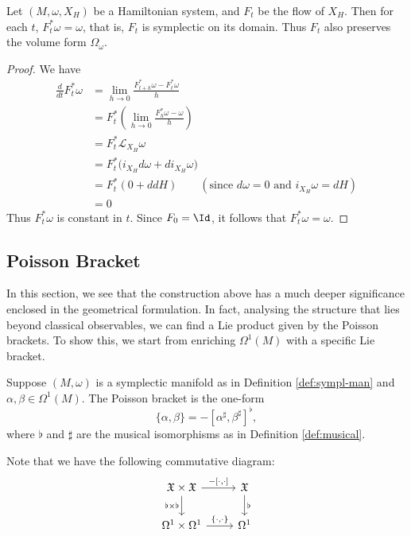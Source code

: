 \begin{proposition}\label{thm:liouville}
	Let $(M,\omega,X_H)$ be a Hamiltonian system, and $F_t$ be the flow of $X_H$. Then for each $t$, $F_t^*\omega = \omega$, that is, $F_t$ is symplectic on its domain. Thus $F_t$ also preserves the volume form $\Omega_\omega$.
\end{proposition}

\begin{proof}We have
\begin{align*}
	\frac{d}{dt} F_t^*\omega &= \lim_{h \to 0} \frac{F^*_{t+h}\omega - F^*_t\omega}{h} \\
	&= F_t^* \left( \lim_{h\to 0} \frac{F_h^*\omega - \omega}{h}\right )\\
	&= F_t^* \mathscr{L}_{X_H}\omega \\
	&= F_t^*\big(i_{X_H} d\omega + d i_{X_H}\omega\big) \\
	&= F_t^*(0 + ddH) \qquad (\text{since } d\omega = 0 \text{ and } i_{X_H}\omega = dH) \\
	&= 0
\end{align*}
Thus $F_t^*\omega$ is constant in $t$. Since $F_0 = \Id$, it follows that $F_t^*\omega = \omega$. 
\end{proof}

\subsection*{Poisson Bracket}
In this section, we see that the construction above has a much deeper significance enclosed in the geometrical formulation. In fact, analysing the structure that lies beyond classical observables, we can find a Lie product given by the Poisson brackets. To show this, we start from enriching $\Omega^1(M)$ with a specific Lie bracket.

\begin{definition}\label{def:poi-forms}
	Suppose $(M, \omega)$ is a symplectic manifold as in Definition \ref{def:sympl-man} and $\alpha, \beta \in \Omega^1(M)$. The Poisson bracket is the one-form $$\{\alpha, \beta\} = -[\alpha^\sharp, \beta^\sharp]^\flat,$$ where $\flat$ and $\sharp$ are the musical isomorphisms as in Definition \ref{def:musical}.
\end{definition}

\noindent Note that we have the following commutative diagram:
\[
\begin{tikzcd}
	\mathfrak{X} \times \mathfrak{X} \arrow{r}{-[\cdot, \cdot]} \arrow[swap]{d}{\flat \times \flat} & \mathfrak{X} \arrow{d}{\flat} \\
	\Omega^1 \times \Omega^1 \arrow{r}{\{\cdot, \cdot\}} & \Omega^1
\end{tikzcd}
\]

